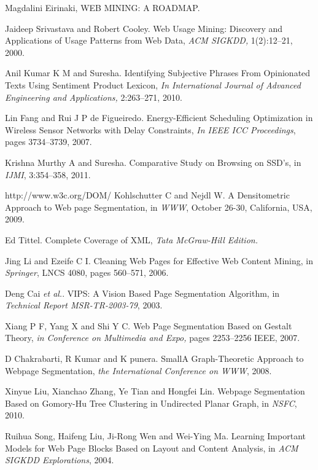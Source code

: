 \documentclass[fleqn,twoside]{article}
\begin{document}
\begin{thebibliography}{00}
Magdalini Eirinaki, WEB MINING: A ROADMAP.

{Jaideep Srivastava and Robert Cooley}. {Web Usage Mining: Discovery and Applications of Usage Patterns from Web Data}, {\it ACM SIGKDD,} 1(2):12--21,  2000.

{Anil Kumar K M and  Suresha}.
{Identifying Subjective Phrases From Opinionated Texts Using Sentiment Product Lexicon}, {\it In International Journal of Advanced Engineering and Applications,} 2:263--271, 2010.

{Lin Fang and Rui J P de Figueiredo}. Energy-Efficient Scheduling Optimization in Wireless Sensor Networks with Delay Constraints, {\it In IEEE ICC Proceedings}, pages 3734--3739, 2007.

{Krishna Murthy A and Suresha}. {Comparative Study on Browsing on SSD's}, in \emph{IJMI}, 3:354--358, 2011.

http://www.w3c.org/DOM/
{Kohlschutter C and Nejdl W}. {A Densitometric Approach to Web page Segmentation}, in \emph{WWW}, October 26-30,  California, USA, 2009.


Ed Tittel. Complete Coverage of XML, {\it Tata McGraw-Hill Edition.}

{Jing Li and Ezeife C I}. {Cleaning Web Pages for Effective Web Content Mining}, in \emph{Springer}, LNCS 4080, pages 560--571, 2006.



{Deng Cai {\it et al.}}. {VIPS: A Vision Based Page Segmentation Algorithm}, in \emph{Technical Report MSR-TR-2003-79}, 2003.

{Xiang P F, Yang X and Shi Y C}. {Web Page Segmentation Based on Gestalt Theory}, \emph{in Conference on Multimedia and Expo,} pages 2253--2256 IEEE, 2007.

{D Chakrabarti, R Kumar and K punera}. {SmallA Graph-Theoretic Approach to Webpage Segmentation}, \emph{the  International Conference on WWW}, 2008.



{Xinyue Liu, Xianchao Zhang, Ye Tian and Hongfei Lin}. {Webpage Segmentation Based on Gomory-Hu Tree Clustering in Undirected Planar Graph}, in \emph{NSFC}, 2010.




{Ruihua Song, Haifeng Liu, Ji-Rong Wen and  Wei-Ying Ma}. {Learning Important Models for Web Page Blocks Based  on Layout and Content Analysis}, in \emph{ACM SIGKDD Explorations},  2004.


\end{thebibliography}
\end{document}
